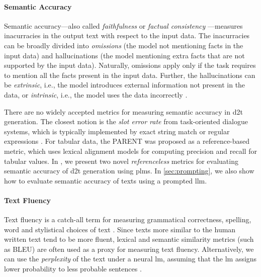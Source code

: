 \paragraph{Semantic Accuracy} Semantic accuracy---also called \emph{faithfulness} or \emph{factual consistency} \cite{celikyilmazEvaluationTextGeneration2021}---measures inacurracies in the output text with respect to the input data. The inacurracies can be broadly divided into \emph{omissions} (the model not mentioning facts in the input data) and hallucinations (the model mentioning extra facts that are not supported by the input data). Naturally, omissions apply only if the task requires to mention all the facts present in the input data. Further, the hallucinations can be \emph{extrinsic}, i.e., the model introduces external information not present in the data, or \emph{intrinsic}, i.e., the model uses the data incorrectly \cite{maynezFaithfulnessFactualityAbstractive2020}.

There are no widely accepted metrics for measuring semantic accuracy in \ac{d2t} generation. The closest notion is the \emph{slot error rate} from task-oriented dialogue systems, which is typically implemented by exact string match or regular expressions  \cite{wen2015semantically,dusekEvaluatingStateoftheartEndtoEnd2020}. For tabular data, the PARENT \cite{dhingraHandlingDivergentReference2019} was proposed as a reference-based metric, which uses lexical alignment models for computing precision and recall for tabular values.  In , we present two novel \emph{referenceless} metrics for evaluating semantic accuracy of \ac{d2t} generation using \acp{plm}. In \autoref{sec:prompting}, we also show how to evaluate semantic accuracy of texts using a prompted \ac{llm}.

\paragraph{Text Fluency} Text fluency is a catch-all term for measuring grammatical correctness, spelling, word and stylistical choices of text \cite{celikyilmazEvaluationTextGeneration2021}. Since texts more similar to the human written text tend to be more fluent, lexical and semantic similarity metrics (such as BLEU) are often used as a proxy for measuring text fluency. Alternatively, we can use the \emph{perplexity} of the text under a neural \ac{lm}, assuming that the \ac{lm} assigns lower probability to less probable sentences \cite{leeFactualityEnhancedLanguage2022,kaneNUBIANeUralBased2020}.


